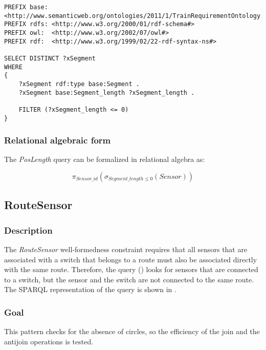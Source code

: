 
\begin{lstlisting}[caption=The PosLength query in SPARQL, label=lst:poslength-sparql]
PREFIX base: <http://www.semanticweb.org/ontologies/2011/1/TrainRequirementOntology.owl#>
PREFIX rdfs: <http://www.w3.org/2000/01/rdf-schema#>
PREFIX owl:  <http://www.w3.org/2002/07/owl#>
PREFIX rdf:  <http://www.w3.org/1999/02/22-rdf-syntax-ns#>

SELECT DISTINCT ?xSegment
WHERE
{
    ?xSegment rdf:type base:Segment .
    ?xSegment base:Segment_length ?xSegment_length .

    FILTER (?xSegment_length <= 0)
}
\end{lstlisting}


\subsubsection{Relational algebraic form} The \textit{PosLength} query can be formalized in relational algebra as:

$$ \pi_{\mathit{Sensor\_id}} \left( \sigma_{\mathit{Segment\_length} \leq 0} \left( \mathit{Sensor} \right) \right) $$

\subsection{RouteSensor}

\subsubsection{Description}

The \textit{RouteSensor} well-formedness constraint requires that all sensors that are associated with a switch that belongs to a route must also be associated directly with the same route. Therefore, the query () looks for sensors that are connected to a switch, but the sensor and the switch are not connected to the same route. The SPARQL representation of the query is shown in .

\subsubsection{Goal} This pattern checks for the absence of circles, so the efficiency of the join and the antijoin operations is tested.

